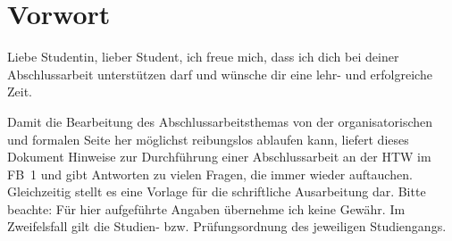 \section*{Vorwort}

Liebe Studentin, lieber Student, ich freue mich, dass ich dich bei deiner Abschlussarbeit unterstützen darf und wünsche dir eine lehr- und erfolgreiche Zeit. 


Damit die  Bearbeitung des Abschlussarbeitsthemas von der organisatorischen und formalen Seite her möglichst reibungslos ablaufen kann,  liefert dieses Dokument Hinweise zur Durchführung einer Abschlussarbeit an der HTW im FB~1 und gibt Antworten zu vielen Fragen, die immer wieder auftauchen.
Gleichzeitig stellt es eine Vorlage für die schriftliche Ausarbeitung dar. Bitte beachte: Für hier aufgeführte Angaben übernehme ich keine Gewähr. Im Zweifelsfall gilt die Studien- bzw. Prüfungsordnung des jeweiligen Studiengangs.






